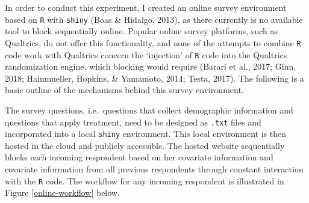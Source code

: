 \documentclass[12pt,econ]{sources/authesis}
\begin{document}
In order to conduct this experiment, I created an online survey environment based on \texttt{R} with \texttt{shiny} (Boas \& Hidalgo, 2013), as there currently is no available tool to block sequentially online. Popular online survey platforms, such as Qualtrics, do not offer this functionality, and none of the attempts to combine \texttt{R} code work with Qualtrics concern the `injection' of \texttt{R} code into the Qualtrics randomization engine, which blocking would require (Barari et al., 2017; Ginn, 2018; Hainmueller, Hopkins, \& Yamamoto, 2014; Testa, 2017). The following is a basic outline of the mechanisms behind this survey environment.

The survey questions, i.e.~questions that collect demographic information and questions that apply treatment, need to be designed as \texttt{.txt} files and incorporated into a local \texttt{shiny} environment. This local environment is then hosted in the cloud and publicly accessible. The hosted website sequentially blocks each incoming respondent based on her covariate information and covariate information from all previous respondents through constant interaction with the \texttt{R} code. The workflow for any incoming respondent is illustrated in Figure \ref{online-workflow} below.
\end{document}
